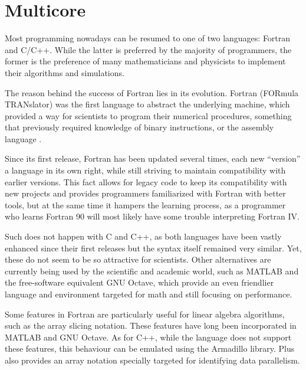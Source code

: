 \documentclass[../thesis]{subfiles}
\begin{document}
	\chapter{Multicore}
	\label{chp:multicore}

	Most \hpc programming nowadays can be resumed to one of two languages: Fortran and C/C++. While the latter is preferred by the majority of programmers, the former is the preference of many mathematicians and physicists to implement their algorithms and simulations.

	The reason behind the success of Fortran lies in its evolution. Fortran (FORmula TRANslator) was the first language to abstract the underlying machine, which provided a way for scientists to program their numerical procedures, something that previously required knowledge of binary instructions, or the assembly language \cite{IBM100:Fortran}.

	Since its first release, Fortran has been updated several times, each new ``version'' a language in its own right, while still striving to maintain compatibility with earlier versions. This fact allows for legacy code to keep its compatibility with new projects and provides programmers familiarized with Fortran with better tools, but at the same time it hampers the learning process, as a programmer who learns Fortran 90 will most likely have some trouble interpreting Fortran IV.

	Such does not happen with C and C++, as both languages have been vastly enhanced since their first releases but the syntax itself remained very similar. Yet, these do not seem to be so attractive for scientists. Other alternatives are currently being used by the scientific and academic world, such as MATLAB and the free-software equivalent GNU Octave, which provide an even friendlier language and environment targeted for math and still focusing on performance.

	Some features in Fortran are particularly useful for linear algebra algorithms, such as the array slicing notation. These features have long been incorporated in MATLAB and GNU Octave. As for C++, while the language does not support these features, this behaviour can be emulated using the Armadillo library. \intel\cilk Plus also provides an array notation specially targeted for identifying data parallelism.
\end{document}
